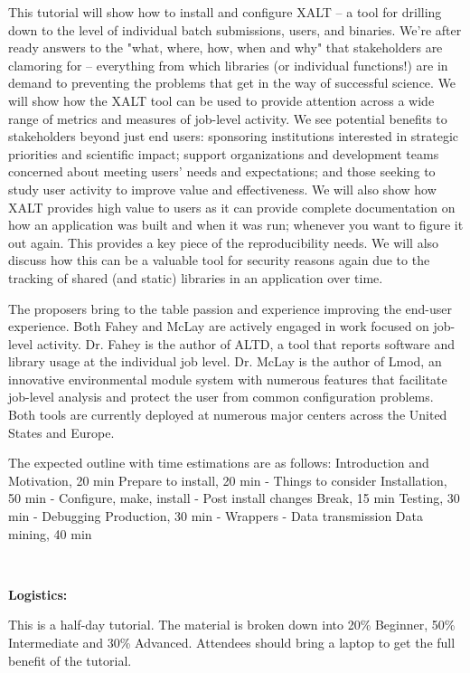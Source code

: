 \documentclass[12pt]{article}
\begin{document}
This tutorial will show how to install and configure XALT – a tool for
drilling down to the level of individual batch submissions, users, and
binaries. We’re after ready answers to the "what, where, how, when and
why" that stakeholders are clamoring for – everything from which
libraries (or individual functions!) are in demand to preventing the
problems that get in the way of successful science. We will show how
the XALT tool can be used to provide attention across a wide range of
metrics and measures of job-level activity. We see potential benefits
to stakeholders beyond just end users: sponsoring institutions
interested in strategic priorities and scientific impact; support
organizations and development teams concerned about meeting users’
needs and expectations; and those seeking to study user activity to
improve value and effectiveness. We will also show how XALT provides
high value to users as it can provide complete documentation on how an
application was built and when it was run; whenever you want to figure
it out again. This provides a key piece of the reproducibility
needs. We will also discuss how this can be a valuable tool for
security reasons again due to the tracking of shared (and static)
libraries in an application over time. 

The proposers bring to the table passion and experience improving the
end-user experience. Both Fahey and McLay are actively engaged in work
focused on job-level activity. Dr. Fahey is the author of ALTD, a tool
that reports software and library usage at the individual job
level. Dr. McLay is the author of Lmod, an innovative environmental
module system with numerous features that facilitate job-level
analysis and protect the user from common configuration problems. Both
tools are currently deployed at numerous major centers across the
United States and Europe. 

The expected outline with time estimations are as follows:
Introduction and Motivation, 20 min Prepare to install, 20 min -
Things to consider Installation, 50 min - Configure, make, install -
Post install changes Break, 15 min Testing, 30 min - Debugging
Production, 30 min - Wrappers - Data transmission Data mining, 40 min 


~~

\noindent
{\bf{}Logistics:}

This is a half-day tutorial.  The material is broken down into 20\%
Beginner, 50\% Intermediate and 30\% Advanced.   Attendees should
bring a laptop to get the full benefit of the tutorial.
\end{document}
